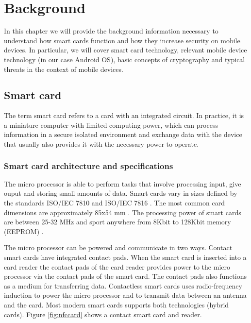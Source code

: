 \chapter{Background}
In this chapter we will provide the background information necessary to understand how smart cards function and how they increase security on mobile devices. In particular, we will cover smart card technology, relevant mobile device technology (in our case Android OS), basic concepts of cryptography and typical threats in the context of mobile devices.

\section{Smart card}
\label{sec:smartcard}
The term smart card refers to a card with an integrated circuit. In practice, it is a miniature computer with limited computing power, which can process information in a secure isolated environment and exchange data with the device that usually also provides it with the necessary power to operate.

\subsection{Smart card architecture and specifications}
The micro processor is able to perform tasks that involve processing input, give ouput and storing small amounts of data. Smart cards vary in sizes defined by the standards ISO/IEC 7810 \cite{iso7810} and ISO/IEC 7816 \cite{iso7816}. The most common card dimensions are approximately 85x54 mm \cite[~Ch. 3.1]{smartcardHandbook}. The processing power of smart cards are between 25-32 MHz and sport anywhere from 8Kbit to 128Kbit memory (EEPROM) \cite{cardProcessing}.

The micro processor can be powered and communicate in two ways. Contact smart cards have integrated contact pads. When the smart card is inserted into a card reader the contact pads of the card reader provides power to the micro processor via the contact pads of the smart card. The contact pads also functions as a medium for transferring data. Contactless smart cards uses radio-frequency induction to power the micro processor and to transmit data between an antenna and the card. Most modern smart cards supports both technologies (hybrid cards). Figure \ref{fig:nfccard} shows a contact smart card and reader.


